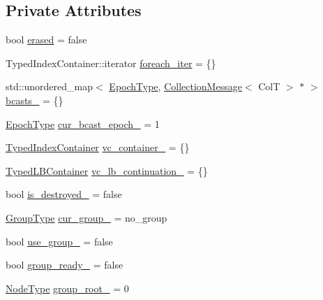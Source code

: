 \subsection*{Private Attributes}
\begin{DoxyCompactItemize}
\item 
bool \hyperlink{structvt_1_1vrt_1_1collection_1_1_holder_a2d053dab199764dce3029b8a55cbf1cc}{erased} = false
\item 
Typed\+Index\+Container\+::iterator \hyperlink{structvt_1_1vrt_1_1collection_1_1_holder_a1b21c6d5b8b0bce316afe9b60e80d621}{foreach\+\_\+iter} = \{\}
\item 
std\+::unordered\+\_\+map$<$ \hyperlink{namespacevt_a985a5adf291c34a3ca263b3378388236}{Epoch\+Type}, \hyperlink{structvt_1_1vrt_1_1collection_1_1_collection_message}{Collection\+Message}$<$ ColT $>$ $\ast$ $>$ \hyperlink{structvt_1_1vrt_1_1collection_1_1_holder_a012801ec34d0ed70bba0260e4383b07e}{bcasts\+\_\+} = \{\}
\item 
\hyperlink{namespacevt_a985a5adf291c34a3ca263b3378388236}{Epoch\+Type} \hyperlink{structvt_1_1vrt_1_1collection_1_1_holder_a966244e1c839d42df86d4e9f62f5c633}{cur\+\_\+bcast\+\_\+epoch\+\_\+} = 1
\item 
\hyperlink{structvt_1_1vrt_1_1collection_1_1_holder_ae8d4ff940c971d52b237cf4d6049380a}{Typed\+Index\+Container} \hyperlink{structvt_1_1vrt_1_1collection_1_1_holder_ad41ddb379b9d88253ea822e5261fb541}{vc\+\_\+container\+\_\+} = \{\}
\item 
\hyperlink{structvt_1_1vrt_1_1collection_1_1_holder_a9738cadcf89ace9c3d0c23990e4f919e}{Typed\+L\+B\+Container} \hyperlink{structvt_1_1vrt_1_1collection_1_1_holder_a510efbbf387e9c93e90a29d4db231aa4}{vc\+\_\+lb\+\_\+continuation\+\_\+} = \{\}
\item 
bool \hyperlink{structvt_1_1vrt_1_1collection_1_1_holder_a862e7f99e626f9ea11de83b635466cab}{is\+\_\+destroyed\+\_\+} = false
\item 
\hyperlink{namespacevt_a27b5e4411c9b6140c49100e050e2f743}{Group\+Type} \hyperlink{structvt_1_1vrt_1_1collection_1_1_holder_a7627f2411c3d19bc070e85b71b1f9fff}{cur\+\_\+group\+\_\+} = no\+\_\+group
\item 
bool \hyperlink{structvt_1_1vrt_1_1collection_1_1_holder_ac897fcc83ba066a30cbf7b81e0283a1f}{use\+\_\+group\+\_\+} = false
\item 
bool \hyperlink{structvt_1_1vrt_1_1collection_1_1_holder_ad4041accaac66318b6ddc027f9730d32}{group\+\_\+ready\+\_\+} = false
\item 
\hyperlink{namespacevt_a866da9d0efc19c0a1ce79e9e492f47e2}{Node\+Type} \hyperlink{structvt_1_1vrt_1_1collection_1_1_holder_a2809b2adf064822eeab947991e8f12d3}{group\+\_\+root\+\_\+} = 0

\end{DoxyCompactItemize}
